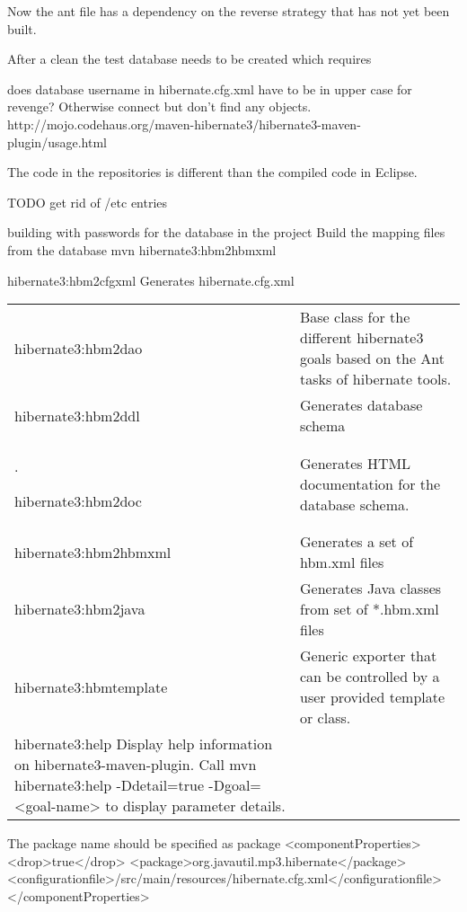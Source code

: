 \documentclass[a4paper,10pt]{book}
\begin{document}
Now the ant file has a dependency on the reverse strategy that has not yet been built.

After a clean the test database needs to be created which requires

does database username in hibernate.cfg.xml have to be in upper case for revenge?  Otherwise connect but don't find any objects.
http://mojo.codehaus.org/maven-hibernate3/hibernate3-maven-plugin/usage.html

The code in the repositories is different than the compiled code in Eclipse.

TODO get rid of /etc entries

building with passwords for the database in the project
Build the mapping files from the database
mvn hibernate3:hbm2hbmxml

hibernate3:hbm2cfgxml
  Generates hibernate.cfg.xml
\begin{tabular}{ l | l}
 
hibernate3:hbm2dao &
  Base class for the different hibernate3 goals based on the Ant tasks of
  hibernate tools. \\ \newline

hibernate3:hbm2ddl &
  Generates database schema \\.

hibernate3:hbm2doc &
  Generates HTML documentation for the database schema. \\

hibernate3:hbm2hbmxml &
  Generates a set of hbm.xml files \\

hibernate3:hbm2java &
  Generates Java classes from set of *.hbm.xml files  \\

hibernate3:hbmtemplate &  Generic exporter that can be controlled by a user provided template or class. \\

hibernate3:help
  Display help information on hibernate3-maven-plugin. Call
    mvn hibernate3:help -Ddetail=true -Dgoal=<goal-name>
  to display parameter details.

\end{tabular}

The package name should be specified as package
  <componentProperties>
            <drop>true</drop>
            <package>org.javautil.mp3.hibernate</package>
            <configurationfile>/src/main/resources/hibernate.cfg.xml</configurationfile>
          </componentProperties>
\end{document}
